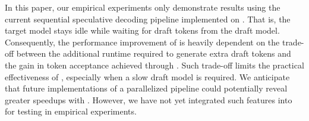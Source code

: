 

In this paper, our empirical experiments only demonstrate results using the current sequential speculative decoding pipeline implemented on \vllm. 
That is, the target model stays idle while waiting for draft tokens from the draft model. 
Consequently, the performance improvement of \alg{} is heavily dependent on the trade-off between the additional runtime required to generate extra draft tokens and the gain in token acceptance achieved through \alg{}.
Such trade-off limits the practical effectiveness of \alg{}, especially when a slow draft model is required.
We anticipate that future implementations of a parallelized pipeline could potentially reveal greater speedups with \alg{}.
However, we have not yet integrated such features into \vllm{} for testing in empirical experiments.
